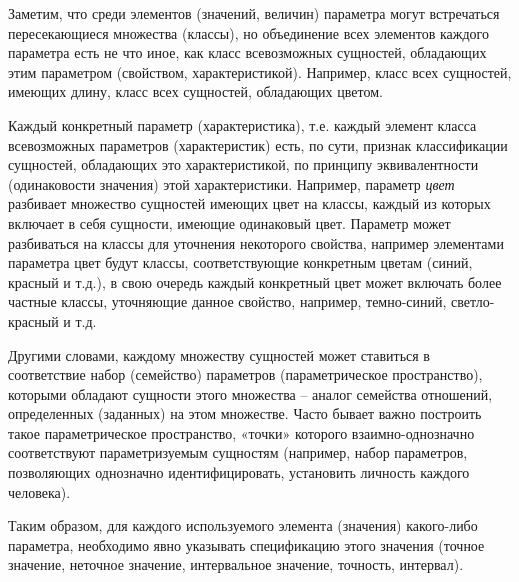 \begin{SCn}
{Заметим, что среди элементов (значений, величин) параметра могут встречаться пересекающиеся множества (классы), но объединение всех элементов каждого параметра есть не что иное, как класс всевозможных сущностей, обладающих этим параметром (свойством, характеристикой). Например, класс всех сущностей, имеющих длину, класс всех сущностей, обладающих цветом.

Каждый конкретный параметр (характеристика), т.е. каждый элемент класса всевозможных параметров (характеристик) есть, по сути, признак классификации сущностей, обладающих это характеристикой, по принципу эквивалентности (одинаковости значения) этой характеристики. Например, параметр \textit{цвет} разбивает множество сущностей имеющих цвет на классы, каждый из которых включает в себя сущности, имеющие одинаковый цвет. Параметр может разбиваться на классы для уточнения некоторого свойства, например элементами параметра цвет будут классы, соответствующие конкретным цветам (синий, красный и т.д.), в свою очередь каждый конкретный цвет может включать более частные классы, уточняющие данное свойство, например, темно-синий, светло-красный и т.д.

Другими словами, каждому множеству сущностей может ставиться в соответствие набор (семейство) параметров (параметрическое пространство), которыми обладают сущности этого множества – аналог семейства отношений, определенных (заданных) на этом множестве. Часто бывает важно построить такое параметрическое пространство, «точки» которого взаимно-однозначно соответствуют параметризуемым сущностям (например, набор параметров, позволяющих однозначно идентифицировать, установить личность каждого человека). 

Таким образом, для каждого используемого элемента (значения) какого-либо параметра, необходимо явно указывать спецификацию этого значения (точное значение, неточное значение, интервальное значение, точность, интервал).}




\end{SCn}
